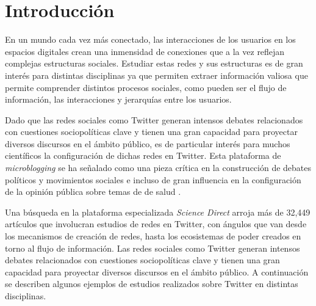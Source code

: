 \chapter{Introducción}
\label{sec:intro}



En un mundo cada vez más conectado, las interacciones de los usuarios en los espacios digitales crean una inmensidad de conexiones que a la vez reflejan complejas estructuras sociales. Estudiar estas redes y sus estructuras es de gran interés para distintas disciplinas ya que permiten extraer información valiosa que permite comprender distintos procesos sociales, como pueden ser el flujo de información, las interacciones y jerarquías entre los usuarios. 

Dado que las redes sociales como Twitter generan intensos debates relacionados con cuestiones sociopolíticas clave y tienen una gran capacidad para proyectar diversos discursos en el ámbito público, es de particular interés para muchos científicos la configuración de dichas redes en Twitter. Esta plataforma de \textit{ microblogging} se ha señalado como una pieza crítica en la construcción de debates políticos y movimientos sociales \cite{barbera_understanding_2015} e incluso de gran influencia en la configuración de la opinión pública sobre temas de de salud \cite{sharevski_misinformation_2022}.

Una búsqueda en la plataforma especializada \textit{Science Direct} arroja más de 32,449 artículos que involucran estudios de redes en Twitter, con ángulos que van desde los mecanismos de creación de redes, hasta los ecosistemas de poder creados en torno al flujo de información. Las redes sociales como Twitter generan intensos debates relacionados con cuestiones sociopolíticas clave y tienen una gran capacidad para proyectar diversos discursos en el ámbito público. A continuación se describen algunos ejemplos de estudios realizados sobre Twitter en distintas disciplinas. 


